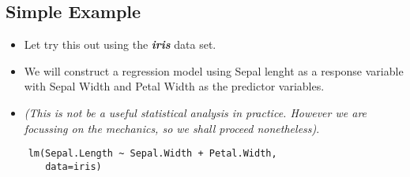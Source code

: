 \documentclass[a4paper,12pt]{article}
\begin{document}
\subsection*{Simple Example}
\begin{itemize}
\item Let try this out using the \textbf{\textit{iris}} data set. 
\item We will construct a regression model using Sepal lenght as a response variable with Sepal Width and Petal Width as the predictor variables.
\item \textit{(This is not be a useful statistical analysis in practice. However we are focussing on the mechanics, so we shall proceed nonetheless)}.
\end{itemize}

\begin{framed}
	\begin{verbatim}
	lm(Sepal.Length ~ Sepal.Width + Petal.Width,
	   data=iris)
	\end{verbatim}
\end{framed}

\newpage
\end{document}
